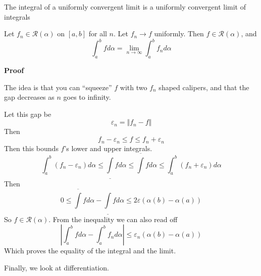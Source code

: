 \begin{theorem} The integral of a uniformly convergent limit is a uniformly convergent limit of integrals

    Let $f_n \in \mathscr{R}(\alpha)$ on $[a, b]$ for all $n$. Let $f_n \rightarrow f$ uniformly. Then $f \in \mathscr{R}(\alpha)$, and
    \[\int_a^b f d\alpha = \lim_{n \to \infty} \int_a^b f_n d\alpha\]

    \textbf{Proof}

    The idea is that you can ``squeeze'' $f$ with two $f_n$ shaped calipers, and that the gap decreases as $n$ goes to infinity.

    Let this gap be 
    \[\varepsilon_n = \Vert f_n - f\Vert\]
    Then
    \[f_n - \varepsilon_n \leq f \leq f_n + \varepsilon_n\]
    Then this bounds $f$'s lower and upper integrals.
    \[\int_a^b (f_n-\varepsilon_n) d\alpha \leq \underline{\int} f d\alpha \leq \overline{\int} f d\alpha \leq \int_a^b (f_n+\varepsilon_n) d\alpha\]
    Then
    \[0 \leq \overline{\int} f d\alpha - \underline{\int} fd\alpha \leq 2 \varepsilon(\alpha(b) - \alpha(a)) \]
    So $f \in \mathscr{R}(\alpha)$. From the inequality we can also read off 
    \[\left| \int_a^b fd\alpha - \int_a^b f_nd\alpha\right| \leq \varepsilon_n (\alpha(b) - \alpha(a))\]
    Which proves the equality of the integral and the limit.
\end{theorem}
    
Finally, we look at differentiation.

